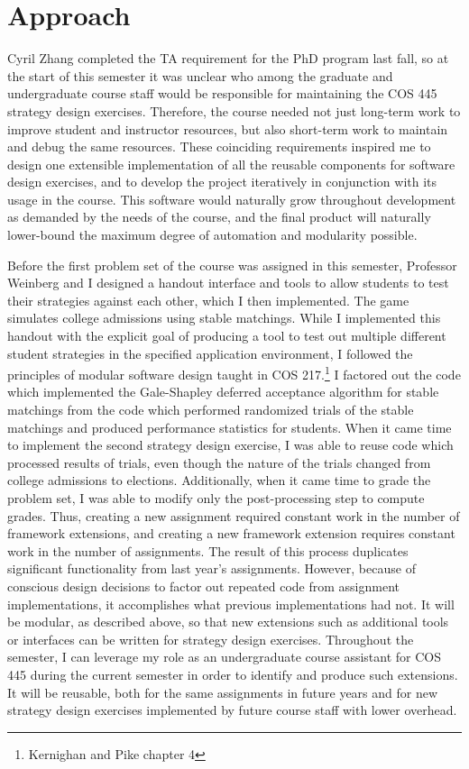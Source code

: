 \documentclass[pageno]{jpaper}
\begin{document}
\section*{Approach}
Cyril Zhang completed the TA requirement for the PhD program last fall, so at the start of this semester it was unclear who among the graduate and undergraduate course staff would be responsible for maintaining the COS 445 strategy design exercises.
Therefore, the course needed not just long-term work to improve student and instructor resources, but also short-term work to maintain and debug the same resources.
These coinciding requirements inspired me to design one extensible implementation of all the reusable components for software design exercises, and to develop the project iteratively in conjunction with its usage in the course.
This software would naturally grow throughout development as demanded by the needs of the course, and the final product will naturally lower-bound the maximum degree of automation and modularity possible.

Before the first problem set of the course was assigned in this semester, Professor Weinberg and I designed a handout interface and tools to allow students to test their strategies against each other, which I then implemented.
The game simulates college admissions using stable matchings.
While I implemented this handout with the explicit goal of producing a tool to test out multiple different student strategies in the specified application environment, I followed the principles of modular software design taught in COS 217.\footnote{Kernighan and Pike chapter 4}
I factored out the code which implemented the Gale-Shapley deferred acceptance algorithm for stable matchings from the code which performed randomized trials of the stable matchings and produced performance statistics for students.
When it came time to implement the second strategy design exercise, I was able to reuse code which processed results of trials, even though the nature of the trials changed from college admissions to elections.
Additionally, when it came time to grade the problem set, I was able to modify only the post-processing step to compute grades.
Thus, creating a new assignment required constant work in the number of framework extensions, and creating a new framework extension requires constant work in the number of assignments.
The result of this process duplicates significant functionality from last year's assignments.
However, because of conscious design decisions to factor out repeated code from assignment implementations, it accomplishes what previous implementations had not.
It will be modular, as described above, so that new extensions such as additional tools or interfaces can be written for strategy design exercises.
Throughout the semester, I can leverage my role as an undergraduate course assistant for COS 445 during the current semester in order to identify and produce such extensions.
It will be reusable, both for the same assignments in future years and for new strategy design exercises implemented by future course staff with lower overhead.
\end{document}
